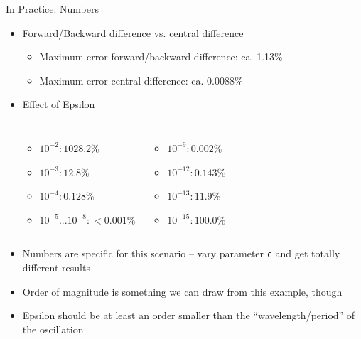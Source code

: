 \begin{frame}{In Practice: Numbers}
%
\begin{itemize}
\item Forward/Backward difference vs. central difference
	\begin{itemize}
	\item Maximum error forward/backward difference: ca. 1.13\%
	\item Maximum error central difference: ca. 0.0088\%
	\end{itemize}
\item Effect of Epsilon
	\vspace{-6pt}
	\begin{columns}[T]
		\begin{itemize}
		\item $10^{-2}: 1028.2\%$
		\item $10^{-3}: 12.8\%$
		\item $10^{-4}: 0.128\%$
		\item $10^{-5} ... 10^{-8}: < 0.001\%$
		\end{itemize}
		\begin{itemize}
		\item $10^{-9}: 0.002\%$
		\item $10^{-12}: 0.143\%$
		\item $10^{-13}: 11.9\%$
		\item $10^{-15}: 100.0\%$
		\end{itemize}
	\end{columns}
	\vspace{6pt}
	
\item Numbers are specific for this scenario -- vary parameter \texttt{c} and get totally different results
\item Order of magnitude is something we can draw from this example, though
\item Epsilon should be at least an order smaller than the \enquote{wavelength/period} of the oscillation
\end{itemize}
%
\end{frame}


